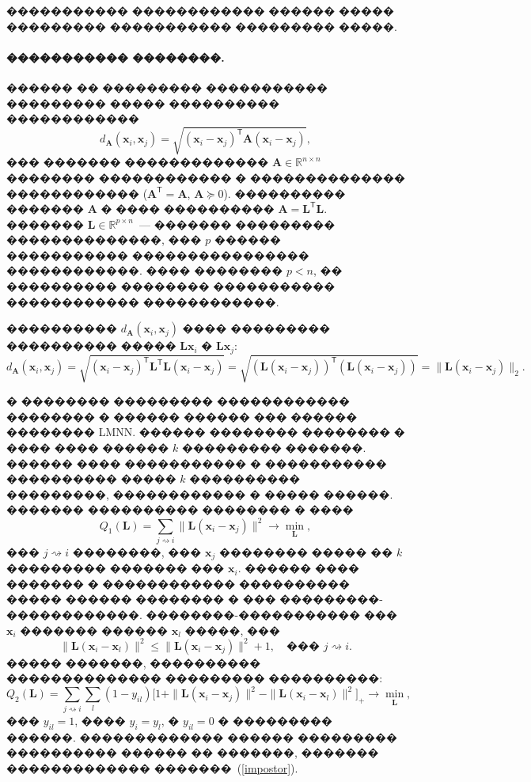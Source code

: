 \documentclass[12pt,twoside, notitlepage]{article}
\newcommand{\RR}{\mathbb{R}}
\begin{document}
����������� ������������ ������ ����� ��������� ����������� ��������� �����.

\paragraph{����������� ��������.}

������ �� ��������� ����������� ��������� ����� ���������� ������������
\[
    d_\mathbf{A} (\mathbf{x}_i, \mathbf{x}_j) = \sqrt{(\mathbf{x}_i - \mathbf{x}_j)^\mathsf{T} \mathbf{A} (\mathbf{x}_i - \mathbf{x}_j)},
\]
��� ������� ������������� $\mathbf{A} \in \RR^{n \times n}$ �������� ������������ � �������������� ������������ ($\mathbf{A}^\mathsf{T} = \mathbf{A}$, $\mathbf{A} \succeq 0$).
���������� ������� $\mathbf{A}$ � ���� ���������� $\mathbf{A} = \mathbf{L}^\mathsf{T}  \mathbf{L}$.
������� $\mathbf{L} \in \RR^{p \times n}$~--- ������� ��������� ��������������, ��� $p$ ������ ����������� ���������������� ������������. ���� �������� $p < n$, �� ���������� �������� ����������� ������������ ������������.

���������� $d_\mathbf{A} (\mathbf{x}_i, \mathbf{x}_j)$ ���� ��������� ���������� ����� $\mathbf{Lx}_i$ � $\mathbf{Lx}_j$:
\[
    d_\mathbf{A} (\mathbf{x}_i, \mathbf{x}_j) = \sqrt{(\mathbf{x}_i - \mathbf{x}_j)^\mathsf{T} \mathbf{L}^\mathsf{T} \mathbf{L} (\mathbf{x}_i - \mathbf{x}_j)} = \sqrt{(\mathbf{L} (\mathbf{x}_i - \mathbf{x}_j))^\mathsf{T} (\mathbf{L} (\mathbf{x}_i - \mathbf{x}_j))} = \|\mathbf{L} (\mathbf{x}_i - \mathbf{x}_j)\|_2.
\]

� �������� ��������� ������������ �������� � ������ ������ ��� ������ �������� LMNN. ������ �������� �������� � ���� ���� ������ $k$ ��������� �������. ������ ���� ����������� � ����������� ���������� ����� $k$ ���������� ���������, ������������ � ����� ������. ������� ���������� �������� � ����
\[
    Q_1(\mathbf{L}) = \sum_{j \rightsquigarrow i} \|\mathbf{L}(\mathbf{x}_i - \mathbf{x}_j)\|^2 \rightarrow \min_{\mathbf{L}},
\]
��� $j \rightsquigarrow i$ ��������, ��� $\mathbf{x}_j$ �������� ����� �� $k$ ��������� ������� ��� $\mathbf{x}_i$.
������ ���� ������� � ������������ ���������� ����� ������ �������� � ��� ���������-������������. ��������-����������� ��� $\mathbf{x}_i$ ������� ������ $\mathbf{x}_l$ �����, ���
\begin{equation}
\label{impostor}
    \|\mathbf{L}(\mathbf{x}_i - \mathbf{x}_l)\|^2 \leq \|\mathbf{L}(\mathbf{x}_i - \mathbf{x}_j)\|^2 + 1, \quad \text{��� $j \rightsquigarrow i$}.
\end{equation}
����� �������, ���������� �������������� ��������� ����������:
\[
    Q_2(\mathbf{L}) = \sum_{j \rightsquigarrow i} \sum_l(1 - y_{il})\bigl[1 + \|\mathbf{L}(\mathbf{x}_i - \mathbf{x}_j)\|^2 - \|\mathbf{L}(\mathbf{x}_i - \mathbf{x}_l)\|^2\bigr]_+ \rightarrow \min_{\mathbf{L}},
\]
��� $y_{il} = 1$, ���� $y_i = y_l$, � $y_{il} = 0$ � ��������� ������.
������������� ������ ��������� ���������� ������ �� �������, ������� ������������� �������~(\ref{impostor}).
\end{document}

